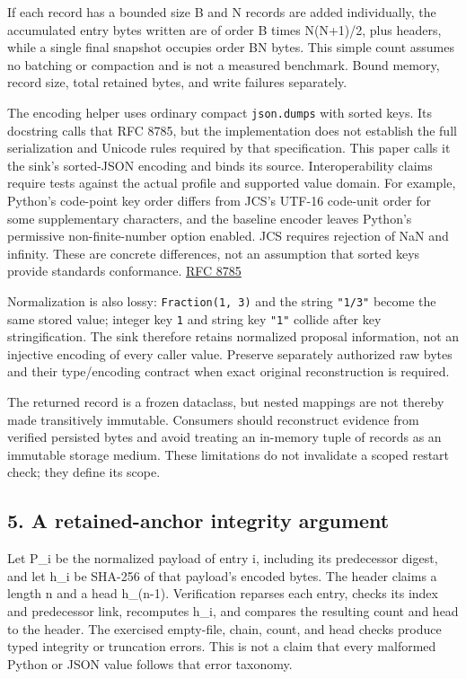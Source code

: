 \documentclass[
  11pt,
]{article}
\newcommand{\passthrough}[1]{#1}
\begin{document}
If each record has a bounded size B and N records are added
individually, the accumulated entry bytes written are of order B times
N(N+1)/2, plus headers, while a single final snapshot occupies order BN
bytes. This simple count assumes no batching or compaction and is not a
measured benchmark. Bound memory, record size, total retained bytes, and
write failures separately.

The encoding helper uses ordinary compact
\passthrough{\lstinline!json.dumps!} with sorted keys. Its docstring
calls that RFC 8785, but the implementation does not establish the full
serialization and Unicode rules required by that specification. This
paper calls it the sink's sorted-JSON encoding and binds its source.
Interoperability claims require tests against the actual profile and
supported value domain. For example, Python's code-point key order
differs from JCS's UTF-16 code-unit order for some supplementary
characters, and the baseline encoder leaves Python's permissive
non-finite-number option enabled. JCS requires rejection of NaN and
infinity. These are concrete differences, not an assumption that sorted
keys provide standards conformance.
\href{https://www.rfc-editor.org/rfc/rfc8785.html}{RFC 8785}

Normalization is also lossy: \texttt{Fraction(1, 3)}
and the string \texttt{\nolinkurl{"1/3"}} become the same stored
value; integer key \passthrough{\lstinline!1!} and string key
\passthrough{\lstinline!"1"!} collide after key stringification. The
sink therefore retains normalized proposal information, not an injective
encoding of every caller value. Preserve separately authorized raw bytes
and their type/encoding contract when exact original reconstruction is
required.

The returned record is a frozen dataclass, but nested mappings are not
thereby made transitively immutable. Consumers should reconstruct
evidence from verified persisted bytes and avoid treating an in-memory
tuple of records as an immutable storage medium. These limitations do
not invalidate a scoped restart check; they define its scope.

\hypertarget{a-retained-anchor-integrity-argument}{%
\subsection{5. A retained-anchor integrity
argument}\label{a-retained-anchor-integrity-argument}}

Let P\_i be the normalized payload of entry i, including its predecessor
digest, and let h\_i be SHA-256 of that payload's encoded bytes. The
header claims a length n and a head h\_(n-1). Verification reparses each
entry, checks its index and predecessor link, recomputes h\_i, and
compares the resulting count and head to the header. The exercised
empty-file, chain, count, and head checks produce typed integrity or
truncation errors. This is not a claim that every malformed Python or
JSON value follows that error taxonomy.
\end{document}
